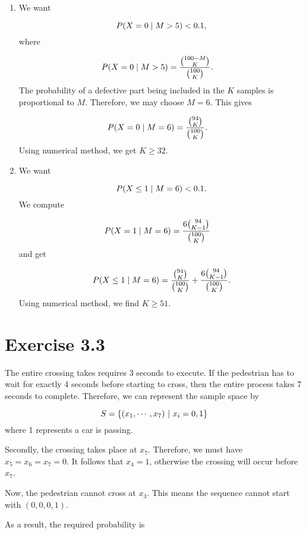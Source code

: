 \documentclass[12pt,letterpaper,reqno]{amsart}
\numberwithin{equation}{subsection}
\begin{document}
\begin{enumerate}[label=(\alph*),leftmargin=*]
\item We want

\[ {P}\! \left( {X = 0 \mid M > 5} \right) < 0.1, \]
where

\begin{align*}
     {P}\! \left( {X = 0 \mid M > 5} \right) &= \frac{\binom{100-M}{K}}{\binom{100}{K}}.
\end{align*}
The probability of a defective part being included in the $K$ samples is proportional to $M$. Therefore, we may choose $M = 6$. This gives

\begin{align*}
    {P}\! \left( {X = 0 \mid M = 6} \right) &= \frac{\binom{94}{K}}{\binom{100}{K}}.
\end{align*}
Using numerical method, we get $K \geq 32$.

\item We want

\[ {P}\! \left( {X \leq 1 \mid M = 6} \right) < 0.1. \]
We compute

\begin{align*}
    {P}\! \left( {X = 1 \mid M = 6} \right) &= \frac{6\binom{94}{K-1}}{\binom{100}{K}}
\end{align*}
and get

\[  {P}\! \left( {X \leq 1 \mid M = 6} \right) =  \frac{\binom{94}{K}}{\binom{100}{K}} + \frac{6\binom{94}{K-1}}{\binom{100}{K}}. \] 
Using numerical method, we find $K \geq 51$.
\end{enumerate}

\newpage
\section{Exercise 3.3}

 The entire crossing takes requires 3 seconds to execute. If the pedestrian has to wait for exactly 4 seconds before starting to cross, then the entire process takes 7 seconds to complete. Therefore, we can represent the sample space by
 
 \[ S = \left\{ {(x_1, \cdots, x_7)} \ \middle| \ {x_i = 0, 1} \right\} \]
 where 1 represents a car is passing.
 
 Secondly, the crossing takes place at $x_7$. Therefore, we must have $x_5 = x_6 = x_7 = 0$. It follows that $x_4 = 1$, otherwise the crossing will occur before $x_7$.
 
 Now, the pedestrian cannot cross at $x_3$. This means the sequence cannot start with $(0,0,0,1)$.
 
 As a result, the required probability is
 
\end{document}
